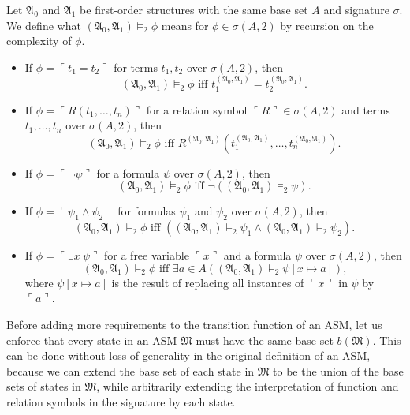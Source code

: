 \documentclass[12pt]{article}
\numberwithin{equation}{section}
\begin{document}
\begin{defi}
Let $\mathfrak{A}_0$ and $\mathfrak{A}_1$ be first-order structures with the same base set $A$ and signature $\sigma$. We define what $(\mathfrak{A}_0, \mathfrak{A}_1) \models_2 \phi$ means for $\phi \in \sigma(A, 2)$ by recursion on the complexity of $\phi$.
\begin{itemize}
    \item If $\phi = \ulcorner t_1 = t_2 \urcorner$ for terms $t_1, t_2$ over $\sigma(A, 2)$, then $$(\mathfrak{A}_0, \mathfrak{A}_1) \models_2 \phi \text{ iff } t_1^{(\mathfrak{A}_0, \mathfrak{A}_1)} = t_2^{(\mathfrak{A}_0, \mathfrak{A}_1)} \text{.}$$
    \item If $\phi = \ulcorner R(t_1, \dots, t_n) \urcorner$ for a relation symbol $\ulcorner R \urcorner \in \sigma(A, 2)$ and terms $t_1, \dots, t_n$ over $\sigma(A, 2)$, then $$(\mathfrak{A}_0, \mathfrak{A}_1) \models_2 \phi \text{ iff } R^{(\mathfrak{A}_0, \mathfrak{A}_1)} (t_1^{(\mathfrak{A}_0, \mathfrak{A}_1)}, \dots, t_n^{(\mathfrak{A}_0, \mathfrak{A}_1)}) \text{.}$$
    \item If $\phi = \ulcorner \neg \psi \urcorner$ for a formula $\psi$ over $\sigma(A, 2)$, then $$(\mathfrak{A}_0, \mathfrak{A}_1) \models_2 \phi \text{ iff } \neg ((\mathfrak{A}_0, \mathfrak{A}_1) \models_2 \psi) \text{.}$$
    \item If $\phi = \ulcorner \psi_1 \wedge \psi_2 \urcorner$ for formulas $\psi_1$ and $\psi_2$ over $\sigma(A, 2)$, then $$(\mathfrak{A}_0, \mathfrak{A}_1) \models_2 \phi \text{ iff } ((\mathfrak{A}_0, \mathfrak{A}_1) \models_2 \psi_1 \wedge (\mathfrak{A}_0, \mathfrak{A}_1) \models_2 \psi_2) \text{.}$$
    \item If $\phi = \ulcorner \exists x \ \psi \urcorner$ for a free variable $\ulcorner x \urcorner$ and a formula $\psi$ over $\sigma(A, 2)$, then $$(\mathfrak{A}_0, \mathfrak{A}_1) \models_2 \phi \text{ iff } \exists a \in A ((\mathfrak{A}_0, \mathfrak{A}_1) \models_2 \psi[x \mapsto a]) \text{,}$$ where $\psi[x \mapsto a]$ is the result of replacing all instances of $\ulcorner x \urcorner$ in $\psi$ by $\ulcorner a \urcorner$.
\end{itemize}
\end{defi}

Before adding more requirements to the transition function of an ASM, let us enforce that every state in an ASM $\mathfrak{M}$ must have the same base set $b(\mathfrak{M})$. This can be done without loss of generality in the original definition of an ASM, because we can extend the base set of each state in $\mathfrak{M}$ to be the union of the base sets of states in $\mathfrak{M}$, while arbitrarily extending the interpretation of function and relation symbols in the signature by each state.
\end{document}
